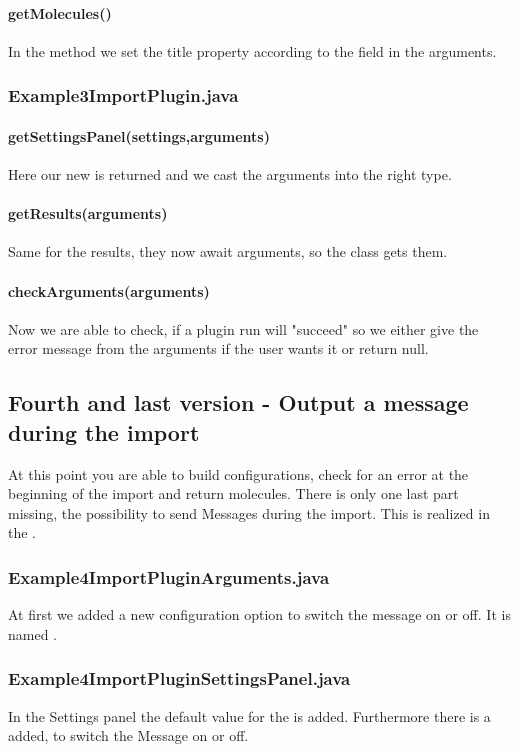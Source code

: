 \paragraph{getMolecules()}
In the  method we set the title property according to the  field in the arguments.

\subsubsection{Example3ImportPlugin.java}

\paragraph{getSettingsPanel(settings,arguments)}
Here our new  is returned and we cast the arguments into the right type.

\paragraph{getResults(arguments)}
Same for the results, they now await arguments, so the class gets them.

\paragraph{checkArguments(arguments)}
Now we are able to check, if a plugin run will "succeed" so we either give the error message from the arguments if the user wants it or return null.

\subsection{Fourth and last version - Output a message during the import}
At this point you are able to build configurations, check for an error at the beginning of the import and return molecules. There is only one last part missing, the possibility to send Messages during the import. This is realized in the .

\subsubsection{Example4ImportPluginArguments.java}
At first we added a new configuration option to switch the message on or off. It is named .

\subsubsection{Example4ImportPluginSettingsPanel.java}
In the Settings panel the default value for the  is added. Furthermore there is a  added, to switch the Message on or off.


